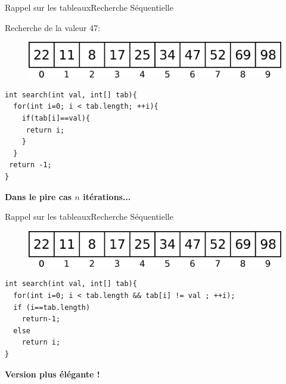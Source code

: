 \documentclass[12pt,a4paper,handout]{beamer}
\begin{document}
\begin{frame}[fragile]{Rappel sur les tableaux}{Recherche Séquentielle}

Recherche de la valeur 47:


\begin{figure}
\centering
\includegraphics[scale=0.3]{figs/array}
\end{figure}

\pause
\begin{lstlisting}[tabsize=2,showtabs]
int search(int val, int[] tab){
  for(int i=0; i < tab.length; ++i){
    if(tab[i]==val){
     return i;
    }
  }
 return -1;
}

\end{lstlisting}
\pause
 \begin{center}
   \textcolor{blueemph}{\textbf{Dans le pire cas $n$ itérations...
}}
   \end{center} 

\end{frame}

\begin{frame}[fragile]{Rappel sur les tableaux}{Recherche Séquentielle}
\begin{figure}
\centering
\includegraphics[scale=0.3]{figs/array}
\end{figure}

\pause
\begin{lstlisting}[tabsize=2,showtabs]
int search(int val, int[] tab){
  for(int i=0; i < tab.length && tab[i] != val ; ++i);
  if (i==tab.length)
    return-1;
  else
    return i;
}

\end{lstlisting}
\pause
 \begin{center}
   \textcolor{blueemph}{\textbf{Version plus élégante !}}
  \end{center} 

\end{frame}
\end{document}
